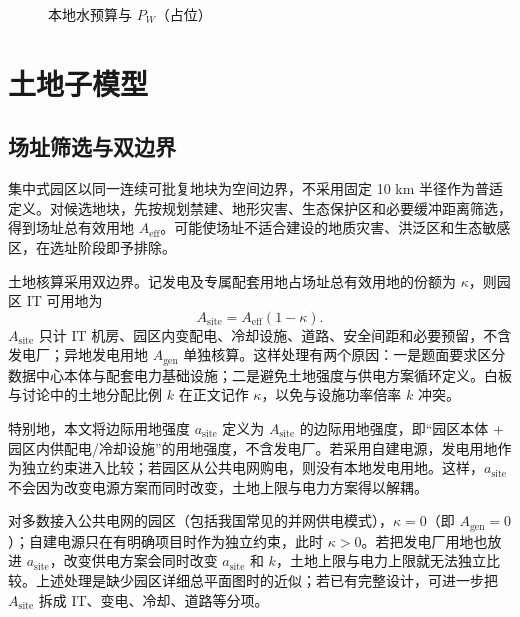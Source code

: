 \documentclass{mcmthesis}
\begin{document}
\begin{figure}[H]
\centering
{}
\caption{本地水预算与 \(P_W\)（占位）}
\label{fig:water}
\end{figure}

\section{土地子模型}
\label{sec:land}

\subsection{场址筛选与双边界}

集中式园区以同一连续可批复地块为空间边界，不采用固定 10 km 半径作为普适定义。对候选地块，先按规划禁建、地形灾害、生态保护区和必要缓冲距离筛选，得到场址总有效用地 \(A_{\mathrm{eff}}\)。可能使场址不适合建设的地质灾害、洪泛区和生态敏感区，在选址阶段即予排除。

土地核算采用双边界。记发电及专属配套用地占场址总有效用地的份额为 \(\kappa\)，则园区 IT 可用地为
\begin{equation}
A_{\mathrm{site}}=A_{\mathrm{eff}}(1-\kappa).
\tag{12}
\end{equation}
\(A_{\mathrm{site}}\) 只计 IT 机房、园区内变配电、冷却设施、道路、安全间距和必要预留，不含发电厂；异地发电用地 \(A_{\mathrm{gen}}\) 单独核算。这样处理有两个原因：一是题面要求区分数据中心本体与配套电力基础设施；二是避免土地强度与供电方案循环定义。白板与讨论中的土地分配比例 \(k\) 在正文记作 \(\kappa\)，以免与设施功率倍率 \(k\) 冲突。

特别地，本文将边际用地强度 \(a_{\mathrm{site}}\) 定义为 \(A_{\mathrm{site}}\) 的边际用地强度，即“园区本体 + 园区内供配电/冷却设施”的用地强度，不含发电厂。若采用自建电源，发电用地作为独立约束进入比较；若园区从公共电网购电，则没有本地发电用地。这样，\(a_{\mathrm{site}}\) 不会因为改变电源方案而同时改变，土地上限与电力方案得以解耦。

对多数接入公共电网的园区（包括我国常见的并网供电模式），\(\kappa=0\)（即 \(A_{\mathrm{gen}}=0\)）；自建电源只在有明确项目时作为独立约束，此时 \(\kappa>0\)。若把发电厂用地也放进 \(a_{\mathrm{site}}\)，改变供电方案会同时改变 \(a_{\mathrm{site}}\) 和 \(k\)，土地上限与电力上限就无法独立比较。上述处理是缺少园区详细总平面图时的近似；若已有完整设计，可进一步把 \(A_{\mathrm{site}}\) 拆成 IT、变电、冷却、道路等分项。
\end{document}
